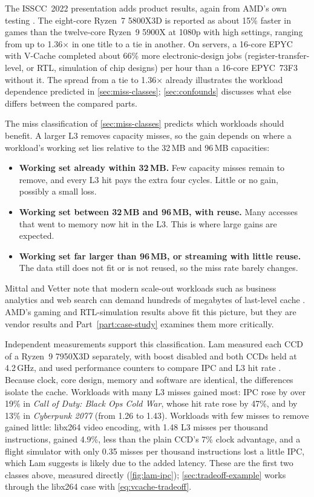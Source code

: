 The ISSCC~2022 presentation adds product results, again from AMD's own testing \cite[slides~29, 31, 35]{wuu2022vcache}. The eight-core Ryzen~7 5800X3D is reported as about 15\% faster in games than the twelve-core Ryzen~9 5900X at 1080p with high settings, ranging from up to 1.36$\times$ in one title to a tie in another. On servers, a 16-core EPYC with V-Cache completed about 66\% more electronic-design jobs (register-transfer-level, or RTL, simulation of chip designs) per hour than a 16-core EPYC~73F3 without it. The spread from a tie to 1.36$\times$ already illustrates the workload dependence predicted in \cref{sec:miss-classes}; \cref{sec:confounds} discusses what else differs between the compared parts.

The miss classification of \cref{sec:miss-classes} predicts which workloads should benefit. A larger L3 removes capacity misses, so the gain depends on where a workload's working set lies relative to the 32\,MB and 96\,MB capacities:
\begin{itemize}
  \item \textbf{Working set already within 32\,MB.} Few capacity misses remain to remove, and every L3 hit pays the extra four cycles. Little or no gain, possibly a small loss.
  \item \textbf{Working set between 32\,MB and 96\,MB, with reuse.} Many accesses that went to memory now hit in the L3. This is where large gains are expected.
  \item \textbf{Working set far larger than 96\,MB, or streaming with little reuse.} The data still does not fit or is not reused, so the miss rate barely changes.
\end{itemize}
Mittal and Vetter note that modern scale-out workloads such as business analytics and web search can demand hundreds of megabytes of last-level cache \cite[sec.~1]{mittalSurveyTechniquesArchitecting2016}. AMD's gaming and RTL-simulation results above fit this picture, but they are vendor results and Part~\ref{part:case-study} examines them more critically.

Independent measurements support this classification. Lam measured each CCD of a Ryzen~9 7950X3D separately, with boost disabled and both CCDs held at 4.2\,GHz, and used performance counters to compare IPC and L3 hit rate \cite{lamAMDs7950X3DZen2023}. Because clock, core design, memory and software are identical, the differences isolate the cache. Workloads with many L3 misses gained most: IPC rose by over 19\% in \emph{Call of Duty: Black Ops Cold War}, whose hit rate rose by 47\%, and by 13\% in \emph{Cyberpunk 2077} (from 1.26 to 1.43). Workloads with few misses to remove gained little: libx264 video encoding, with 1.48 L3 misses per thousand instructions, gained 4.9\%, less than the plain CCD's 7\% clock advantage, and a flight simulator with only 0.35 misses per thousand instructions lost a little IPC, which Lam suggests is likely due to the added latency. These are the first two classes above, measured directly (\cref{fig:lam-ipc}); \cref{sec:tradeoff-example} works through the libx264 case with \cref{eq:vcache-tradeoff}.

